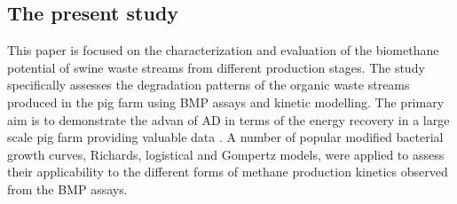 \subsection{The present study}
This paper is focused on the characterization and evaluation of the biomethane potential of swine waste streams from different production stages. The study specifically assesses the degradation patterns of the organic waste streams produced in the pig farm using BMP assays and kinetic modelling. The primary aim is to demonstrate the advan of AD in terms of the energy recovery in a large scale pig farm providing valuable data . A number of popular modified bacterial growth curves, Richards, logistical and Gompertz models, were applied to assess their applicability to the different forms of methane production kinetics observed from the BMP assays.